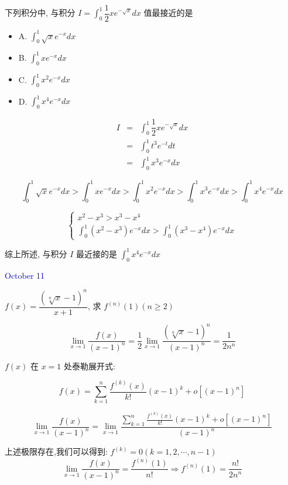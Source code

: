 \begin{example}[][Exam: 36.2.6]
	下列积分中, 与积分 $\displaystyle{I=\int_{0}^{1}\dfrac{1}{2}xe^{-\sqrt{x}}dx}$ 值最接近的是
\begin{itemize}
	\item A. $\int_{0}^{1}\sqrt{x}e^{-x}dx$
	\item B. $\int_{0}^{1}xe^{-x}dx$
	\item C. $\int_{0}^{1}x^2e^{-x}dx$
	\item D. $\int_{0}^{1}x^4e^{-x}dx$
\end{itemize}
\end{example}

\begin{solution}
	\begin{eqnarray*}
		I & = & \int_{0}^{1}\dfrac{1}{2}xe^{-\sqrt{x}}dx\\
		  & = & \int_{0}^{1}t^3e^{-t}dt\\
		  & = & \int_{0}^{1}x^3e^{-x}dx
	\end{eqnarray*}
	  
	$$\int_{0}^{1}\sqrt{x}e^{-x}dx>\int_{0}^{1}xe^{-x}dx>\int_{0}^{1}x^{2}e^{-x}dx>\int_{0}^{1}x^{3}e^{-x}dx>\int_{0}^{1}x^{4}e^{-x}dx$$
	
	$$\begin{cases}
		x^{2} - x^{3} > x^{3} - x^{4}\\
		\displaystyle{\int_{0}^{1}(x^{2}-x^{3})e^{-x}dx > \int_{0}^{1}(x^{3}-x^{4})e^{-x}dx}
	\end{cases}$$
	
	综上所述, 与积分 $I$ 最近接的是 $\displaystyle{\int_{0}^{1}x^{4}e^{-x}dx}$
\end{solution}


\textcolor{blue}{October 11}

\begin{example}[][Exam: 36.2.7]
	$f(x)=\dfrac{\left(\sqrt[n]{x}-1\right) ^n}{x+1}$, 求 $f^{(n)}(1)(n\geq 2)$
\end{example}

\begin{solution}

	$$\lim\limits_{x\to 1}\dfrac{f(x)}{(x-1)^n}=\dfrac{1}{2}\lim\limits_{x\to 1}\dfrac{(\sqrt[n]{x}-1)^n}{(x-1)^n}=\dfrac{1}{2n^{n}}$$
	
	$f(x)$ 在 $x = 1$ 处泰勒展开式:

	$$f(x) = \sum\limits_{k=1}^{n}\dfrac{f^{(k)}(x)}{k!}(x-1)^{k} + o[(x-1)^{n}]$$ 

	$$\lim\limits_{x\to 1}\dfrac{f(x)}{(x-1)^n}=\lim\limits_{x\to 1}\dfrac{\sum\limits_{k=1}^{n}\frac{f^{(k)}(x)}{k!}(x-1)^k+o[(x-1)^n]}{(x-1)^n}$$
	
	上述极限存在,我们可以得到:  $f^{(k)}=0(k=1,2,\cdots,n-1)$
	$$\lim\limits_{x\to 1}\dfrac{f(x)}{(x-1)^n}=\dfrac{f^{(n)}(1)}{n!}\Rightarrow f^{(n)}(1)=\dfrac{n!}{2n^{n}}$$
\end{solution}

